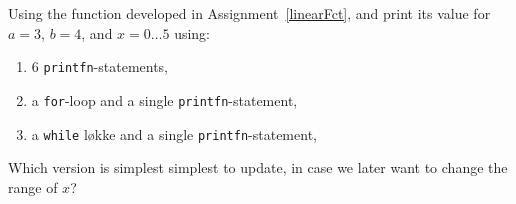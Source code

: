 \label{table} Using the function developed in Assignment~\ref{linearFct}, and print its value for $a=3$, $b=4$, and $x=0\ldots5$ using:
\begin{enumerate}
\item 6 \lstinline!printfn!-statements,
\item a \lstinline!for!-loop and a single \lstinline!printfn!-statement,
\item a \lstinline!while! løkke and a single \lstinline!printfn!-statement,
\end{enumerate}
Which version is simplest simplest to update, in case we later want to change the range of $x$?
